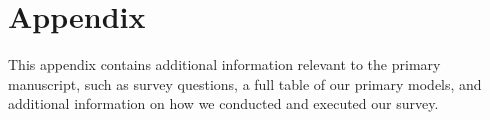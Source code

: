 \documentclass[12pt]{article}
\begin{document}
\appendix
\section*{Appendix} 
\setcounter{table}{0}
\renewcommand{\thetable}{A\arabic{table}}
\setcounter{figure}{0}
\renewcommand{\thefigure}{A\arabic{figure}}

This appendix contains additional information relevant to the primary manuscript, such as survey questions, a full table of our primary models, and additional information on how we conducted and executed our survey.\\  



\newpage

\tableofcontents
\listoftables
\listoffigures


\clearpage



\clearpage
\end{document}
